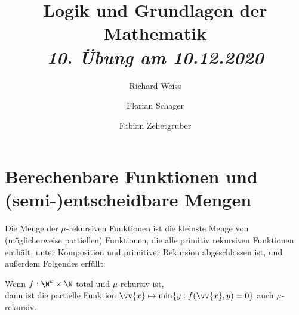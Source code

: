 \documentclass{article}
\title
{
  Logik und Grundlagen der Mathematik \\
  \vspace{4pt}
  \normalsize
  \textit{10. Übung am 10.12.2020}
}
\author
{
  Richard Weiss
  \and
  Florian Schager
  \and
  Fabian Zehetgruber
}
\date{}
\begin{document}
\maketitle

\section*{Berechenbare Funktionen und (semi-)entscheidbare Mengen}

Die Menge der $\mu$-rekursiven Funktionen ist die kleinste Menge von (möglicherweise partiellen)
Funktionen, die alle primitiv rekursiven Funktionen enthält, unter Komposition und
primitiver Rekursion abgeschlossen ist, und außerdem Folgendes erfüllt:

\begin{adjustwidth}{1cm}{}
Wenn $f: \N^k \times \N$ total und $\mu$-rekursiv ist, \\
dann ist die partielle Funktion $\vv{x} \mapsto \min\{y: f(\vv{x},y) = 0\}$ auch
$\mu$-rekursiv.
\end{adjustwidth}


\pagebreak







\end{document}
